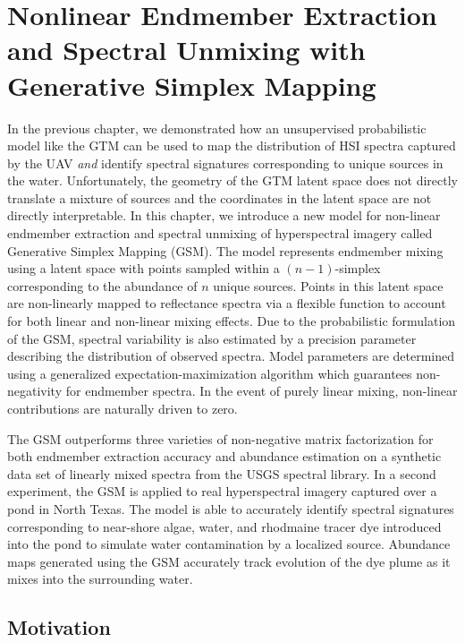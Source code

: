 \chapter{Nonlinear Endmember Extraction and Spectral Unmixing with Generative Simplex Mapping}\label{ch:robot-team-gsm}


In the previous chapter, we demonstrated how an unsupervised probabilistic model
like the GTM can be used to map the distribution of HSI spectra captured by the
UAV \textit{and} identify spectral signatures corresponding to unique sources in
the water. Unfortunately, the geometry of the GTM latent space does not
directly translate a mixture of sources and the coordinates in the latent space
are not directly interpretable. In this chapter, we introduce a new model for
non-linear endmember extraction and spectral unmixing of hyperspectral imagery
called Generative Simplex Mapping (GSM). The model represents endmember mixing
using a latent space with points sampled within a $(n-1)$-simplex corresponding
to the abundance of $n$ unique sources. Points in this latent space are
non-linearly mapped to reflectance spectra via a flexible function to account for
both linear and non-linear mixing effects. Due to the probabilistic formulation
of the GSM, spectral variability is also estimated by a precision parameter
describing the distribution of observed spectra. Model parameters are determined
using a generalized expectation-maximization algorithm which guarantees
non-negativity for endmember spectra. In the event of purely
linear mixing, non-linear contributions are naturally driven to zero.

The GSM outperforms three varieties of non-negative matrix factorization for both
endmember extraction accuracy and abundance estimation on a synthetic data set
of linearly mixed spectra from the USGS spectral library. In a second
experiment, the GSM is applied to real hyperspectral imagery captured over a
pond in North Texas. The model is able to accurately identify spectral
signatures corresponding to near-shore algae, water, and rhodmaine tracer dye
introduced into the pond to simulate water contamination by a localized
source. Abundance maps generated using the GSM accurately track evolution of
the dye plume as it mixes into the surrounding water.


\section{Motivation}


